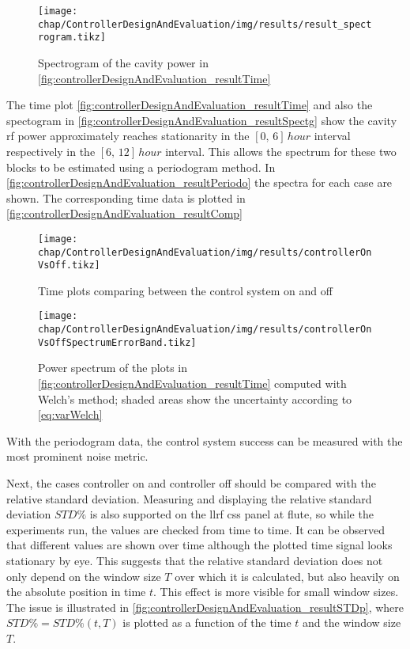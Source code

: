 \begin{figure}[tb]
	\centering
	\texttt{[image: chap/ControllerDesignAndEvaluation/img/results/result\_spectrogram.tikz]}
	\caption{Spectrogram of the cavity power in \autoref{fig:controllerDesignAndEvaluation_resultTime}}
	\label{fig:controllerDesignAndEvaluation_resultSpectg}
\end{figure}

The time plot \autoref{fig:controllerDesignAndEvaluation_resultTime} and also the spectogram in \autoref{fig:controllerDesignAndEvaluation_resultSpectg} show the cavity \gls{rf} power approximately reaches stationarity in the $[0,\,6]\,\si{hour}$ interval respectively in the $[6,\,12]\, \si{hour}$ interval.
This allows the spectrum for these two blocks to be estimated using a periodogram method. In \autoref{fig:controllerDesignAndEvaluation_resultPeriodo} the spectra for each case are shown. The corresponding time data is plotted in \autoref{fig:controllerDesignAndEvaluation_resultComp}

\begin{figure}[tb]
	\centering
	\texttt{[image: chap/ControllerDesignAndEvaluation/img/results/controllerOnVsOff.tikz]}
	\caption{Time plots comparing between the control system on and off}
	\label{fig:controllerDesignAndEvaluation_resultComp}
\end{figure}

\begin{figure}[tb]
	\centering
	\texttt{[image: chap/ControllerDesignAndEvaluation/img/results/controllerOnVsOffSpectrumErrorBand.tikz]}
	\caption{Power spectrum of the plots in \autoref{fig:controllerDesignAndEvaluation_resultTime} computed with Welch's method; shaded areas show the uncertainty according to \autoref{eq:varWelch}}
	\label{fig:controllerDesignAndEvaluation_resultPeriodo}
\end{figure}

With the periodogram data, the control system success can be measured with the most prominent noise metric.

Next, the cases controller on and controller off should be compared with the relative standard deviation. Measuring and displaying the relative standard deviation $STD\%$ is also supported on the \gls{llrf} \gls{css} panel at \gls{flute}, so while the experiments run, the values are checked from time to time. It can be observed that different values are shown over time although the plotted time signal looks stationary by eye. This suggests that the relative standard deviation does not only depend on the window size $T$ over which it is calculated, but also heavily on the absolute position in time $t$. This effect is more visible for small window sizes. The issue is illustrated in \autoref{fig:controllerDesignAndEvaluation_resultSTDp}, where $STD\%=STD\%(t,T)$ is plotted as a function of the time $t$ and the window size $T$.

